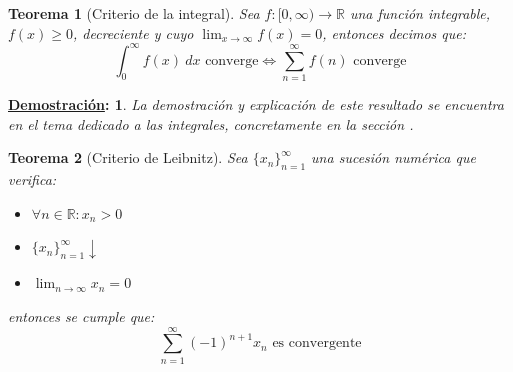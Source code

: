 \documentclass[10pt,a4paper,openright]{book}
\theoremstyle{break}
\newtheorem*{theo}{Teorema}
\newtheorem*{demo}{\underline{Demostración}:}
\newcommand{\dif}[1]{\ d#1}
\begin{document}
\begin{theo}[Criterio de la integral]
Sea $f:[0, \infty)\rightarrow \mathbb R$ una función integrable, $f(x)\geq 0 $, decreciente y cuyo $\lim_{x \rightarrow \infty} f(x) = 0$, entonces decimos que:
$$\int_{0}^{\infty} f(x) \dif{x} \mbox{ converge} \Leftrightarrow \sum_{n = 1 }^{\infty} f(n)\mbox{ converge}$$
\end{theo}
\begin{demo}
La demostración y explicación de este resultado se encuentra en el tema dedicado a las integrales, concretamente en la sección .
\end{demo}

\begin{theo}[Criterio de Leibnitz]
Sea $\{x_n\}_{n=1}^\infty$ una sucesión numérica que verifica:
\begin{itemize}
\item $\forall n \in \mathbb{R}: x_n > 0$
\item $\{x_n\}_{n=1}^\infty \downarrow$
\item $\lim_{n \rightarrow \infty} x_n = 0$
\end{itemize}
entonces se cumple que:
$$\sum_{n=1}^{\infty} (-1)^{n+1}x_n\mbox{ es convergente}$$
\end{theo}
\end{document}
